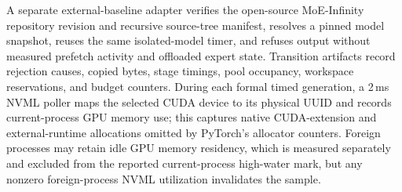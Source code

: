 A separate external-baseline adapter verifies the open-source MoE-Infinity repository revision and recursive source-tree manifest, resolves a pinned model snapshot, reuses the same isolated-model timer, and refuses output without measured prefetch activity and offloaded expert state. Transition artifacts record rejection causes, copied bytes, stage timings, pool occupancy, workspace reservations, and budget counters. During each formal timed generation, a 2\,ms NVML poller maps the selected CUDA device to its physical UUID and records current-process GPU memory use; this captures native CUDA-extension and external-runtime allocations omitted by PyTorch's allocator counters. Foreign processes may retain idle GPU memory residency, which is measured separately and excluded from the reported current-process high-water mark, but any nonzero foreign-process NVML utilization invalidates the sample.

